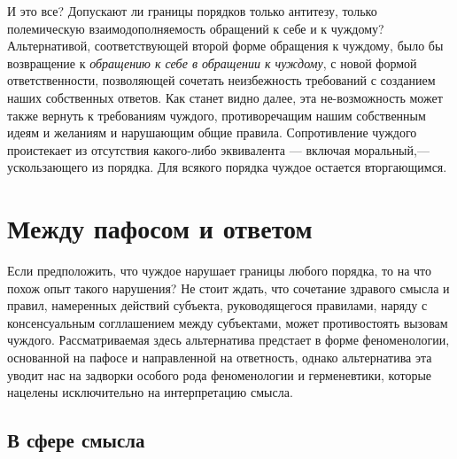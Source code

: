 \documentclass[12pt]{book}
\begin{document}
И это все? Допускают ли границы порядков только антитезу, только полемическую взаимодополняемость обращений к себе и к чуждому? Альтернативой, соответствующей второй форме обращения к чуждому, было бы возвращение к \textit{обращению к себе в обращении к чуждому}, с новой формой ответственности, позволяющей сочетать неизбежность требований с созданием наших собственных ответов. Как станет видно далее, эта не-возможность может также вернуть к требованиям чуждого, противоречащим нашим собственным идеям и желаниям и нарушающим общие правила. Сопротивление чуждого проистекает из отсутствия какого-либо эквивалента --- включая моральный,--- ускользающего из порядка. Для всякого порядка чуждое остается вторгающимся.

\chapter{Между пафосом и ответом}

Если предположить, что чуждое нарушает границы любого порядка, то на что похож опыт такого нарушения? Не стоит ждать, что сочетание здравого смысла и правил, намеренных действий субъекта, руководящегося правилами, наряду с консенсуальным согллашением между субъектами, может противостоять вызовам чуждого. Рассматриваемая здесь альтернатива предстает в форме феноменологии, основанной на пафосе и направленной на ответность, однако альтернатива эта уводит нас на задворки особого рода феноменологии и герменевтики, которые нацелены исключительно на интерпретацию смысла.

\section{В сфере смысла}
\end{document}

